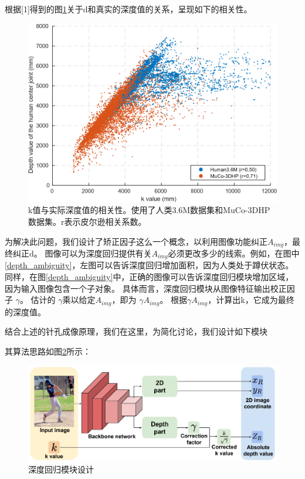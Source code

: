 根据[1]得到的图\ref{k_depth}关于d和真实的深度值的关系，呈现如下的相关性。

\begin{figure}[h]
	\includegraphics{pic/k_depth.png}
	\caption{k值与实际深度值的相关性。使用了人类3.6M数据集和MuCo-3DHP数据集。r表示皮尔逊相关系数。}
	\label{k_depth}
\end{figure}

为解决此问题，我们设计了矫正因子这么一个概念，以利用图像功能纠正${A_{img}}$，最终纠正d。 图像可以为深度回归提供有关${A_{img}}$必须更改多少的线索。例如，在图中\ref{depth_ambiguity}，左图可以告诉深度回归增加面积，因为人类处于蹲伏状态。同样，在图\ref{depth_ambiguity}中，正确的图像可以告诉深度回归模块增加区域，因为输入图像包含一个子对象。 具体而言，深度回归模块从图像特征输出校正因子
$ \gamma$。 估计的
$ \gamma$乘以给定${A_{img}}$，即为
$ \gamma {A_{img}}$。 根据$ \gamma {A_{img}}$，计算出k，它成为最终的深度值。

结合上述的针孔成像原理，我们在这里，为简化讨论，我们设计如下模块

其算法思路如图\ref{k_depth_model}所示：

\begin{figure}[h]
	\includegraphics[width=\textwidth]{pic/K_depth_model.png}
	\caption{深度回归模块设计}
	\label{k_depth_model}
\end{figure}

